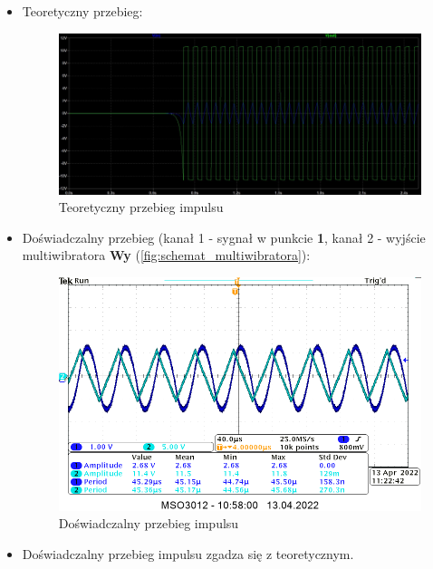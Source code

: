\begin{itemize}
    \item Teoretyczny przebieg:
        \begin{figure}[H]
            \centering
            \includegraphics[width=\textwidth]{img/theoretical/multiwibrator_przebieg.png}
            \caption{Teoretyczny przebieg impulsu}
            \label{fig:multiwibrator_teor_przebieg}
        \end{figure}
    \item Doświadczalny przebieg (kanał 1 - sygnał w punkcie \textbf{1}, kanał 2 - wyjście multiwibratora \textbf{Wy} (\ref{fig:schemat_multiwibratora}):
        \begin{figure}[H]
            \centering
            \includegraphics[width=\textwidth]{img/osciloscope/1_5_period_cropped.png}
            \caption{Doświadczalny przebieg impulsu}
            \label{fig:multiwibrator_dosw_przebieg}
        \end{figure}
    \item Doświadczalny przebieg impulsu zgadza się z teoretycznym.
\end{itemize}

